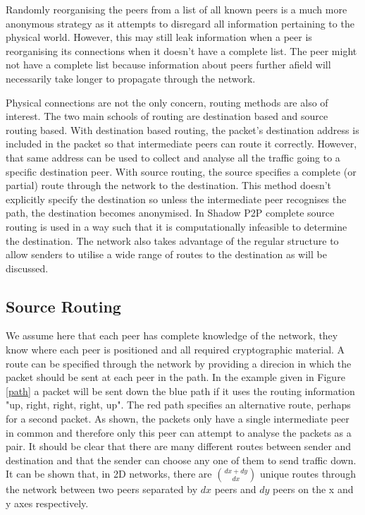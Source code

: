 \documentclass[ %
                    author={Luke Murray},
                supervisor={Dr. Simon Hollis},
                     title={Shadow Peer-to-Peer Networks},
                  subtitle={},
                    degree={MEng},
                      year={2013} ]{thesis}
\begin{document}
Randomly reorganising the peers from a list of all known peers is a much more anonymous strategy as it attempts to disregard all information pertaining to the physical world. However, this may still leak information when a peer is reorganising its connections when it doesn't have a complete list. The peer might not have a complete list because information about peers further afield will necessarily take longer to propagate through the network.

Physical connections are not the only concern, routing methods are also of interest. The two main schools of routing are destination based and source routing based. With destination based routing, the packet's destination address is included in the packet so that intermediate peers can route it correctly. However, that same address can be used to collect and analyse all the traffic going to a specific destination peer. With source routing, the source specifies a complete (or partial) route through the network to the destination. This method doesn't explicitly specify the destination so unless the intermediate peer recognises the path, the destination becomes anonymised. In Shadow P2P complete source routing is used in a way such that it is computationally infeasible to determine the destination. The network also takes advantage of the regular structure to allow senders to utilise a wide range of routes to the destination as will be discussed.

\subsection{Source Routing}

We assume here that each peer has complete knowledge of the network, they know where each peer is positioned and all required cryptographic material. A route can be specified through the network by providing a direcion in which the packet should be sent at each peer in the path. In the example given in Figure \ref{path} a packet will be sent down the blue path if it uses the routing information "up, right, right, right, up". The red path specifies an alternative route, perhaps for a second packet. As shown, the packets only have a single intermediate peer in common and therefore only this peer can attempt to analyse the packets as a pair. It should be clear that there are many different routes between sender and destination and that the sender can choose any one of them to send traffic down. It can be shown that, in 2D networks, there are ${dx + dy \choose dx}$ unique routes through the network between two peers separated by $dx$ peers and $dy$ peers on the x and y axes respectively.
\end{document}
